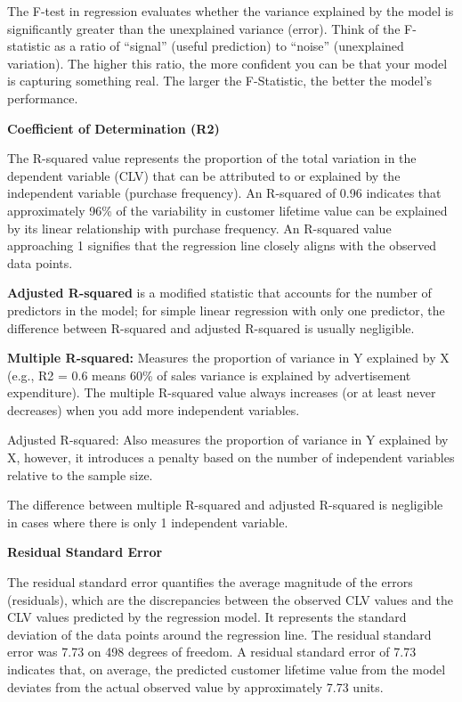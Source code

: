 \documentclass[
]{article}
\begin{document}
The F-test in regression evaluates whether the variance explained by the
model is significantly greater than the unexplained variance (error).
Think of the F-statistic as a ratio of ``signal'' (useful prediction) to
``noise'' (unexplained variation). The higher this ratio, the more
confident you can be that your model is capturing something real. The
larger the F-Statistic, the better the model's performance.

\textbf{Coefficient of Determination (R2)}

The R-squared value represents the proportion of the total variation in
the dependent variable (CLV) that can be attributed to or explained by
the independent variable (purchase frequency). An R-squared of 0.96
indicates that approximately 96\% of the variability in customer
lifetime value can be explained by its linear relationship with purchase
frequency. An R-squared value approaching 1 signifies that the
regression line closely aligns with the observed data points.

\textbf{Adjusted R-squared} is a modified statistic that accounts for
the number of predictors in the model; for simple linear regression with
only one predictor, the difference between R-squared and adjusted
R-squared is usually negligible.

\textbf{Multiple R-squared:} Measures the proportion of variance in Y
explained by X (e.g., R2 = 0.6 means 60\% of sales variance is explained
by advertisement expenditure). The multiple R-squared value always
increases (or at least never decreases) when you add more independent
variables.

Adjusted R-squared: Also measures the proportion of variance in Y
explained by X, however, it introduces a penalty based on the number of
independent variables relative to the sample size.

The difference between multiple R-squared and adjusted R-squared is
negligible in cases where there is only 1 independent variable.

\textbf{Residual Standard Error}

The residual standard error quantifies the average magnitude of the
errors (residuals), which are the discrepancies between the observed CLV
values and the CLV values predicted by the regression model. It
represents the standard deviation of the data points around the
regression line. The residual standard error was 7.73 on 498 degrees of
freedom. A residual standard error of 7.73 indicates that, on average,
the predicted customer lifetime value from the model deviates from the
actual observed value by approximately 7.73 units.
\end{document}
